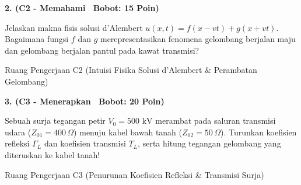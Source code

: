 \documentclass[10pt,a4paper]{article}
\begin{document}
\vspace{1mm}

\noindent\textbf{2. (C2 - Memahami \textbar\ Bobot: 15 Poin)}\par\vspace{0.5mm}
{\footnotesize Jelaskan makna fisis solusi d'Alembert $u(x,t) = f(x - vt) + g(x + vt)$. Bagaimana fungsi $f$ dan $g$ merepresentasikan fenomena gelombang berjalan maju dan gelombang berjalan pantul pada kawat transmisi?}
\begin{answerbox}{Ruang Pengerjaan C2 (Intuisi Fisika Solusi d'Alembert \& Perambatan Gelombang)}
  \vspace{2.1cm}
\end{answerbox}

\vspace{1mm}

\noindent\textbf{3. (C3 - Menerapkan \textbar\ Bobot: 20 Poin)}\par\vspace{0.5mm}
\noindent\begin{minipage}[t]{0.60\textwidth}%
  {\footnotesize Sebuah surja tegangan petir $V_0 = 500\text{ kV}$ merambat pada saluran transmisi udara ($Z_{01} = 400\,\Omega$) menuju kabel bawah tanah ($Z_{02} = 50\,\Omega$). Turunkan koefisien refleksi $\Gamma_L$ dan koefisien transmisi $T_L$, serta hitung tegangan gelombang yang diteruskan ke kabel tanah!}%
\end{minipage}%
\hfill%
\begin{minipage}[t]{0.37\textwidth}%
  \centering
\end{minipage}\par\vspace{1mm}
\begin{answerbox}{Ruang Pengerjaan C3 (Penurunan Koefisien Refleksi \& Transmisi Surja)}
  \vspace{2.8cm}
\end{answerbox}
\end{document}
